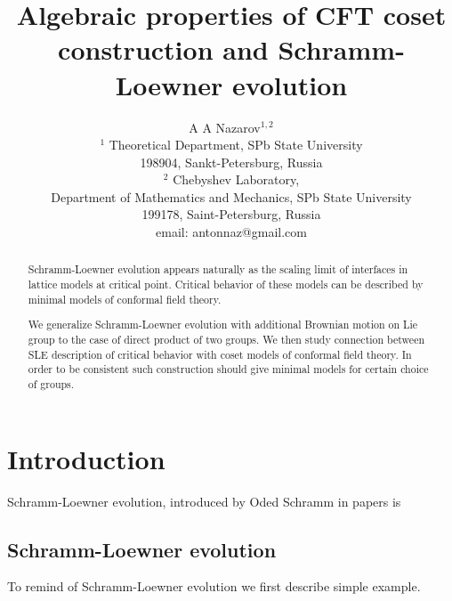\documentclass[12pt]{article}
\theoremstyle{definition}
\theoremstyle{definition} \newtheorem{Def}{Definition}
\begin{document}
\title{Algebraic properties of CFT coset construction and Schramm-Loewner evolution}
\author{A A Nazarov$^{1,2}$\\
  {\small $^1$ Theoretical Department, SPb State University}\\
  {\small 198904, Sankt-Petersburg, Russia}\\
  {\small$^{2}$ Chebyshev Laboratory,}\\
  {\small Department of Mathematics and Mechanics, SPb State University}\\
  {\small 199178, Saint-Petersburg, Russia}\\
  {\small email: antonnaz@gmail.com}}

\maketitle

\begin{abstract}
  Schramm-Loewner evolution appears naturally as the scaling limit of interfaces in lattice models at critical point. Critical behavior of these models can be described by minimal models of conformal field theory.

  We generalize Schramm-Loewner evolution with additional Brownian motion on Lie group to the case of direct product of two groups. We then study connection between SLE description of critical behavior with coset models of conformal field theory. In order to be consistent such construction should give minimal models for certain choice of groups. 

\end{abstract}

\section{Introduction}
Schramm-Loewner evolution, introduced by Oded Schramm in papers \cite{schramm2000scaling} is 

\subsection{Schramm-Loewner evolution}
To remind of Schramm-Loewner evolution we first describe simple example.
\end{document}
